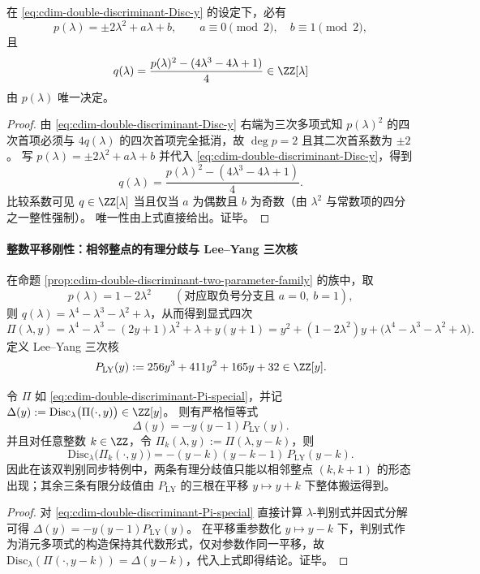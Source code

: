 \begin{proposition}[双判别同步族的二参数压缩]\label{prop:cdim-double-discriminant-two-parameter-family}
在 \eqref{eq:cdim-double-discriminant-Disc-y} 的设定下，必有
\[
p(\lambda)=\pm 2\lambda^{2}+a\lambda+b,
\qquad
a\equiv 0\pmod{2},\quad b\equiv 1\pmod{2},
\]
且
\[
q(\lambda)=\frac{p(\lambda)^{2}-(4\lambda^{3}-4\lambda+1)}{4}\in\ZZ[\lambda]
\]
由 \(p(\lambda)\) 唯一决定。
\end{proposition}
\begin{proof}
由 \eqref{eq:cdim-double-discriminant-Disc-y} 右端为三次多项式知 \(p(\lambda)^{2}\) 的四次首项必须与 \(4q(\lambda)\) 的四次首项完全抵消，故 \(\deg p=2\) 且其二次首系数为 \(\pm 2\)。
写 \(p(\lambda)=\pm 2\lambda^{2}+a\lambda+b\) 并代入 \eqref{eq:cdim-double-discriminant-Disc-y}，得到
\[
q(\lambda)=\frac{p(\lambda)^{2}-(4\lambda^{3}-4\lambda+1)}{4}.
\]
比较系数可见 \(q\in\ZZ[\lambda]\) 当且仅当 \(a\) 为偶数且 \(b\) 为奇数（由 \(\lambda^{2}\) 与常数项的四分之一整性强制）。
唯一性由上式直接给出。证毕。
\end{proof}

\paragraph{整数平移刚性：相邻整点的有理分歧与 Lee--Yang 三次核}
在命题 \ref{prop:cdim-double-discriminant-two-parameter-family} 的族中，取
\[
p(\lambda)=1-2\lambda^{2}
\qquad(\text{对应取负号分支且 }a=0,\ b=1),
\]
则 \(q(\lambda)=\lambda^{4}-\lambda^{3}-\lambda^{2}+\lambda\)，从而得到显式四次
\begin{equation}\label{eq:cdim-double-discriminant-Pi-special}
\Pi(\lambda,y)=\lambda^{4}-\lambda^{3}-(2y+1)\lambda^{2}+\lambda+y(y+1)
=y^{2}+(1-2\lambda^{2})y+\bigl(\lambda^{4}-\lambda^{3}-\lambda^{2}+\lambda\bigr).
\end{equation}
定义 Lee--Yang 三次核
\[
P_{\mathrm{LY}}(y):=256y^{3}+411y^{2}+165y+32\in\ZZ[y].
\]

\begin{proposition}[判别式核的因式分解与整数平移闭包]\label{prop:cdim-double-discriminant-integer-translate-rigidity}
令 \(\Pi\) 如 \eqref{eq:cdim-double-discriminant-Pi-special}，并记
\(
\Delta(y):=\mathrm{Disc}_{\lambda}\bigl(\Pi(\cdot,y)\bigr)\in\ZZ[y]
\)。
则有严格恒等式
\[
\Delta(y)=-y(y-1)P_{\mathrm{LY}}(y).
\]
并且对任意整数 \(k\in\ZZ\)，令 \(\Pi_k(\lambda,y):=\Pi(\lambda,y-k)\)，则
\[
\mathrm{Disc}_{\lambda}\bigl(\Pi_k(\cdot,y)\bigr)
=-(y-k)(y-k-1)\,P_{\mathrm{LY}}(y-k).
\]
因此在该双判别同步特例中，两条有理分歧值只能以相邻整点 \((k,k+1)\) 的形态出现；其余三条有限分歧值由 \(P_{\mathrm{LY}}\) 的三根在平移 \(y\mapsto y+k\) 下整体搬运得到。
\end{proposition}
\begin{proof}
对 \eqref{eq:cdim-double-discriminant-Pi-special} 直接计算 \(\lambda\)-判别式并因式分解可得 \(\Delta(y)=-y(y-1)P_{\mathrm{LY}}(y)\)。
在平移重参数化 \(y\mapsto y-k\) 下，判别式作为消元多项式的构造保持其代数形式，仅对参数作同一平移，故
\(
\mathrm{Disc}_{\lambda}(\Pi(\cdot,y-k))=\Delta(y-k)
\)，代入上式即得结论。证毕。
\end{proof}

